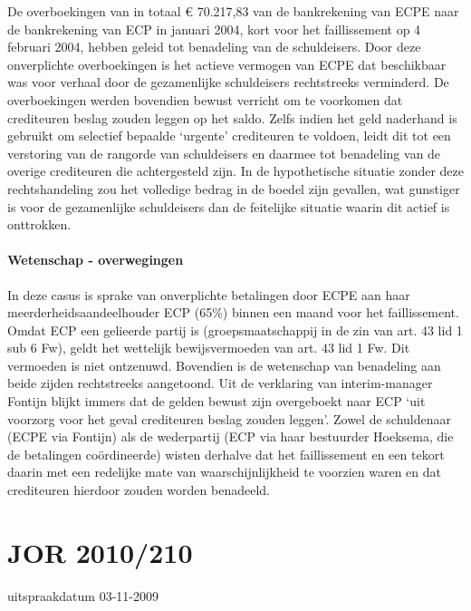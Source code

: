 \documentclass[
  dutch,
  a4paper,
]{article}
\begin{document}
De overboekingen van in totaal € 70.217,83 van de bankrekening van ECPE naar de bankrekening van ECP in januari 2004, kort voor het faillissement op 4 februari 2004, hebben geleid tot benadeling van de schuldeisers. Door deze onverplichte overboekingen is het actieve vermogen van ECPE dat beschikbaar was voor verhaal door de gezamenlijke schuldeisers rechtstreeks verminderd. De overboekingen werden bovendien bewust verricht om te voorkomen dat crediteuren beslag zouden leggen op het saldo. Zelfs indien het geld naderhand is gebruikt om selectief bepaalde `urgente' crediteuren te voldoen, leidt dit tot een verstoring van de rangorde van schuldeisers en daarmee tot benadeling van de overige crediteuren die achtergesteld zijn. In de hypothetische situatie zonder deze rechtshandeling zou het volledige bedrag in de boedel zijn gevallen, wat gunstiger is voor de gezamenlijke schuldeisers dan de feitelijke situatie waarin dit actief is onttrokken.

\paragraph{Wetenschap - overwegingen}\label{wetenschap---overwegingen-53}

In deze casus is sprake van onverplichte betalingen door ECPE aan haar meerderheidsaandeelhouder ECP (65\%) binnen een maand voor het faillissement. Omdat ECP een gelieerde partij is (groepsmaatschappij in de zin van art. 43 lid 1 sub 6 Fw), geldt het wettelijk bewijsvermoeden van art. 43 lid 1 Fw. Dit vermoeden is niet ontzenuwd. Bovendien is de wetenschap van benadeling aan beide zijden rechtstreeks aangetoond. Uit de verklaring van interim-manager Fontijn blijkt immers dat de gelden bewust zijn overgeboekt naar ECP `uit voorzorg voor het geval crediteuren beslag zouden leggen'. Zowel de schuldenaar (ECPE via Fontijn) als de wederpartij (ECP via haar bestuurder Hoeksema, die de betalingen coördineerde) wisten derhalve dat het faillissement en een tekort daarin met een redelijke mate van waarschijnlijkheid te voorzien waren en dat crediteuren hierdoor zouden worden benadeeld.

\newpage


\section{JOR 2010/210}\label{jor-2010210}

uitspraakdatum 03-11-2009
\end{document}
